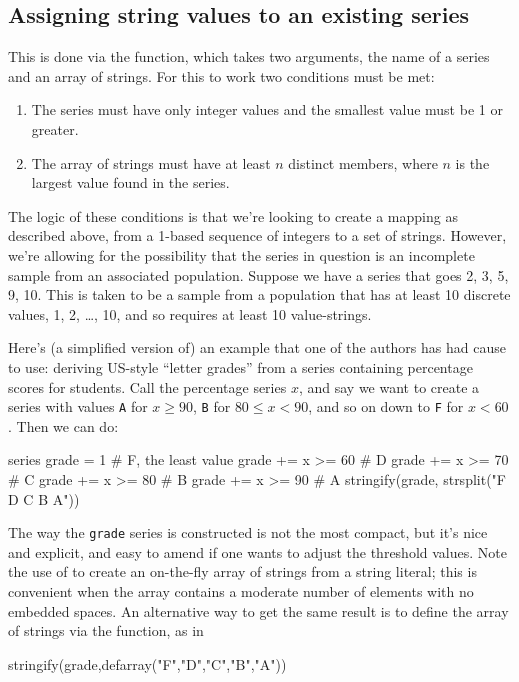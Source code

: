 \subsection{Assigning string values to an existing series}
\label{sec:stringify}

This is done via the  function, which takes two
arguments, the name of a series and an array of strings. For this to
work two conditions must be met:

\begin{enumerate}
\item The series must have only integer values and the smallest value
  must be 1 or greater.
\item The array of strings must have at least $n$ distinct members,
  where $n$ is the largest value found in the series.
\end{enumerate}

The logic of these conditions is that we're looking to create a
mapping as described above, from a 1-based sequence of integers to a
set of strings. However, we're allowing for the possibility that the
series in question is an incomplete sample from an associated
population. Suppose we have a series that goes 2, 3, 5, 9, 10. This is
taken to be a sample from a population that has at least 10 discrete
values, 1, 2, \dots{}, 10, and so requires at least 10 value-strings.

Here's (a simplified version of) an example that one of the authors
has had cause to use: deriving US-style ``letter grades'' from a
series containing percentage scores for students. Call the percentage
series $x$, and say we want to create a series with values \texttt{A}
for $x \geq 90$, \texttt{B} for $80 \leq x <90$, and so on down to
\texttt{F} for $x<60$. Then we can do:
\begin{code}
series grade = 1 # F, the least value
grade += x >= 60 # D
grade += x >= 70 # C
grade += x >= 80 # B
grade += x >= 90 # A
stringify(grade, strsplit("F D C B A"))
\end{code}
%
The way the \texttt{grade} series is constructed is not the most
compact, but it's nice and explicit, and easy to amend if one wants to
adjust the threshold values. Note the use of  to
create an on-the-fly array of strings from a string literal; this is
convenient when the array contains a moderate number of elements with
no embedded spaces. An alternative way to get the same result is to
define the array of strings via the  function, as in
\begin{code}
stringify(grade,defarray("F","D","C","B","A"))
\end{code}

